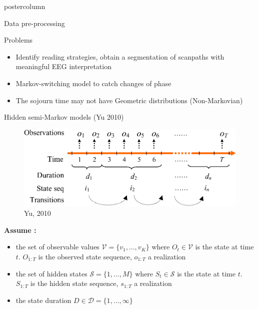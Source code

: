 \documentclass[final,hyperref={pdfpagelabels=false}]{beamer}
\begin{document}
\begin{frame}
\begin{columns}
\begin{column}{.50\textwidth}
\begin{beamercolorbox}[center,wd=\textwidth]{postercolumn}
\begin{minipage}[T]{.98\textwidth}
{\begin{block}{Data pre-processing}
            \end{block}
            \vfill
            \begin{block}{Problems}
                \begin{itemize}
                    \item[\bullet] Identify reading strategies, obtain a segmentation of scanpaths with meaningful EEG interpretation
                    \item[\bullet] Markov-switching model to catch changes of phase
                    \item[\bullet] The sojourn time may not have Geometric distributions (Non-Markovian)
                \end{itemize}
            \end{block}
            \vfill
            \begin{block}{Hidden semi-Markov models (Yu 2010)}
                \begin{figure}[H]
                    \includegraphics[width=.60\linewidth]{hsmm_representation.png}
                    \caption{Yu, 2010}
                \end{figure}
                \vskip-2cm
                \textbf{Assume :}
                \begin{itemize}
                    \item[\bullet] the set of observable values $\mathcal{V} = \{ v_1,..., v_K\}$
                    where $O_t \in \mathcal{V}$ is the state at time $t$. $O_{1:T}$ is the observed state sequence,
                    $o_{1:T}$ a realization
                    \item[\bullet] the set of hidden states $\mathcal{S}=\{1,...,M\}$
                    where $S_t \in \mathcal{S}$ is the state at time $t$. $S_{1:T}$ is the hidden state sequence,
                    $s_{1:T}$ a realization
                    \item[\bullet] the state duration $D \in \mathcal{D}=\{1,...,\infty\}$
                \end{itemize}


\end{block}}
\end{minipage}
\end{beamercolorbox}
\end{column}
\end{columns}
\end{frame}
\end{document}
